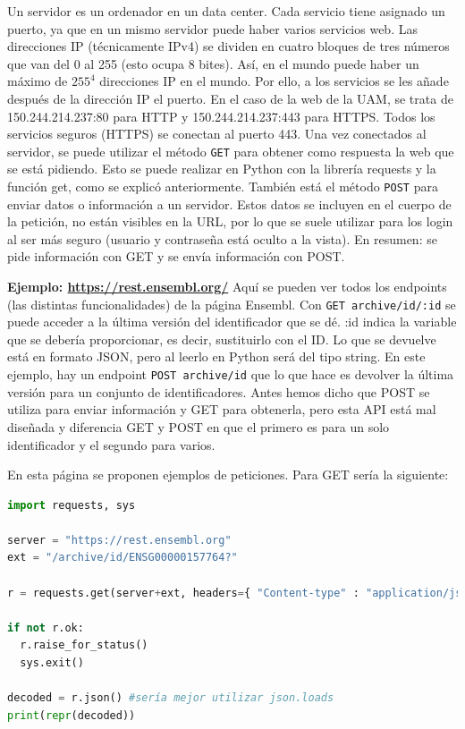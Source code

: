 Un servidor es un ordenador en un data center. Cada servicio tiene asignado un puerto, ya que en un mismo servidor puede haber varios servicios web. Las direcciones IP (técnicamente IPv4) se dividen en cuatro bloques de tres números que van del 0 al 255 (esto ocupa 8 bites). Así, en el mundo puede haber un máximo de $255^4$ direcciones IP en el mundo. Por ello, a los servicios se les añade después de la dirección IP el puerto. En el caso de la web de la UAM, se trata de 150.244.214.237:80 para HTTP y 150.244.214.237:443 para HTTPS. Todos los servicios seguros (HTTPS) se conectan al puerto 443. Una vez conectados al servidor, se puede utilizar el método \texttt{GET} para obtener como respuesta la web que se está pidiendo. Esto se puede realizar en Python con la librería requests y la función get, como se explicó anteriormente. También está el método \texttt{POST} para enviar datos o información a un servidor. Estos datos se incluyen en el cuerpo de la petición, no están visibles en la URL, por lo que se suele utilizar para los login al ser más seguro (usuario y contraseña está oculto a la vista). En resumen: se pide información con GET y se envía información con POST. 

\textbf{Ejemplo: \href{https://rest.ensembl.org/}{https://rest.ensembl.org/}}
Aquí se pueden ver todos los endpoints (las distintas funcionalidades) de la página Ensembl. 
Con \texttt{GET archive/id/:id} se puede acceder a la última versión del identificador que se dé. :id indica la variable que se debería proporcionar, es decir, sustituirlo con el ID. Lo que se devuelve está en formato JSON, pero al leerlo en Python será del tipo string. En este ejemplo, hay un endpoint \texttt{POST archive/id} que lo que hace es devolver la última versión para un conjunto de identificadores. Antes hemos dicho que POST se utiliza para enviar información y GET para obtenerla, pero esta API está mal diseñada y diferencia GET y POST en que el primero es para un solo identificador y el segundo para varios.

En esta página se proponen ejemplos de peticiones. Para GET sería la siguiente:
\begin{lstlisting}[language=Python]
import requests, sys
 
server = "https://rest.ensembl.org"
ext = "/archive/id/ENSG00000157764?"
 
r = requests.get(server+ext, headers={ "Content-type" : "application/json"})
 
if not r.ok:
  r.raise_for_status()
  sys.exit()
 
decoded = r.json() #sería mejor utilizar json.loads 
print(repr(decoded))
\end{lstlisting}

